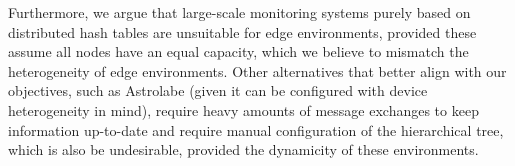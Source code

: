 Furthermore, we argue that large-scale monitoring systems purely based on distributed hash tables \cite{SDIMS} are unsuitable for edge environments, provided these assume all nodes have an equal capacity, which we believe to mismatch the heterogeneity of edge environments. Other  alternatives that better align with our objectives, such as Astrolabe \cite{Renesse2003} (given it can be configured with device heterogeneity in mind), require heavy amounts of message exchanges to keep information up-to-date and require manual configuration of the hierarchical tree, which is also be undesirable, provided the dynamicity of these environments. 





    
    
